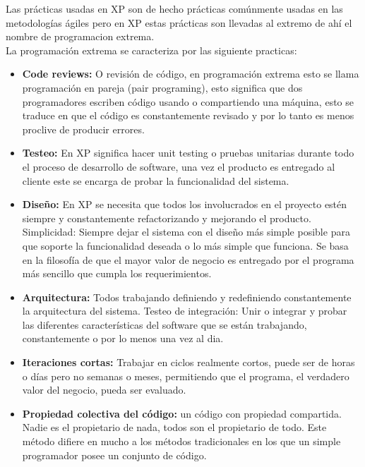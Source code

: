      Las prácticas usadas en XP son de hecho prácticas comúnmente usadas en las metodologías ágiles pero en XP estas prácticas son llevadas al extremo de ahí el nombre de programacion extrema.\\

     La programación extrema se caracteriza por las siguiente practicas:

     \begin{itemize}
       \item \textbf{Code reviews:} O revisión de código, en programación extrema esto se llama programación en pareja (pair programing), esto significa que dos programadores escriben código usando o compartiendo una máquina, esto se traduce en que el código es constantemente revisado y por lo tanto es menos proclive de producir errores.

       \item \textbf{Testeo:} En XP significa hacer unit testing o pruebas unitarias durante todo el proceso de desarrollo de software, una vez el producto es entregado al cliente este se encarga de probar la funcionalidad del sistema.

       \item \textbf{Diseño:} En XP se necesita que todos los involucrados en el proyecto estén siempre y constantemente refactorizando y mejorando el producto.
       Simplicidad: Siempre dejar el sistema con el diseño más simple posible para que soporte la funcionalidad deseada o lo más simple que funciona. Se basa en la filosofía de que el mayor valor de negocio es entregado por el programa más sencillo que cumpla los requerimientos.

       \item \textbf{Arquitectura:} Todos trabajando definiendo y redefiniendo constantemente la arquitectura del sistema.
       Testeo de integración: Unir o integrar y probar las diferentes características del software que se están trabajando, constantemente o por lo menos una vez al dia.

       \item \textbf{Iteraciones cortas:}
       Trabajar en ciclos realmente cortos, puede ser de horas o días pero no semanas o meses, permitiendo que el programa, el verdadero valor del negocio, pueda ser evaluado.

       \item \textbf{Propiedad colectiva del código:}
       un código con propiedad compartida. Nadie es el propietario de nada, todos son el propietario de todo. Este método difiere en mucho a los métodos tradicionales en los que un simple programador posee un conjunto de código.


\end{itemize}
